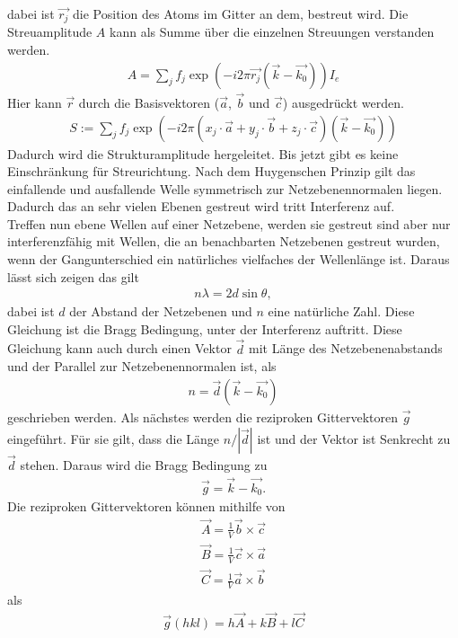 dabei ist $\vec{r_j}$ die Position des Atoms im Gitter an dem, bestreut wird. Die Streuamplitude $A$ kann als Summe über die einzelnen Streuungen verstanden werden.
\begin{align}
	A = \sum_j f_j \exp(-i2\pi\vec{r_j}\left(\vec{k}-\vec{k_0}\right))I_e
\end{align}
Hier kann $\vec{r}$ durch die Basisvektoren ($\vec{a}$, $\vec{b}$ und $\vec{c}$) ausgedrückt werden.
\begin{align}
	S:= \sum_j f_j \exp(-i2\pi\left(x_j\cdot\vec{a}+y_j\cdot\vec{b}+z_j\cdot\vec{c}\right)\left(\vec{k}-\vec{k_0}\right))
\end{align}
Dadurch wird die Strukturamplitude hergeleitet. Bis jetzt gibt es keine Einschränkung für Streurichtung. Nach dem Huygenschen Prinzip gilt das einfallende und ausfallende Welle symmetrisch zur Netzebenennormalen liegen. Dadurch das an sehr vielen Ebenen gestreut wird tritt Interferenz auf.\\
Treffen nun ebene Wellen auf einer Netzebene, werden sie gestreut sind aber nur interferenzfähig mit Wellen, die an benachbarten Netzebenen gestreut wurden, wenn der Gangunterschied ein natürliches vielfaches der Wellenlänge ist. Daraus lässt sich zeigen das gilt
\begin{align}
	n\lambda = 2d\sin\theta,\label{eq:bragg}
\end{align}
dabei ist $d$ der Abstand der Netzebenen und $n$ eine natürliche Zahl. Diese Gleichung ist die Bragg Bedingung, unter der Interferenz auftritt. Diese Gleichung kann auch durch einen Vektor $\vec{d}$ mit Länge des Netzebenenabstands und der Parallel zur Netzebenennormalen ist, als
\begin{align}
	n=\vec{d}\left(\vec{k}-\vec{k_0}\right)
\end{align}
geschrieben werden. Als nächstes werden die reziproken Gittervektoren $\vec{g}$ eingeführt.
Für sie gilt, dass die Länge $n/|\vec{d}|$ ist und der Vektor ist Senkrecht zu $\vec{d}$ stehen. Daraus wird die Bragg Bedingung zu 
\begin{align}
	\vec{g}=\vec{k}-\vec{k_0}.
\end{align}
Die reziproken Gittervektoren können mithilfe von 
\begin{align*}
	\vec{A}=\frac{1}{V}\vec{b}\times\vec{c}\\
	\vec{B}=\frac{1}{V}\vec{c}\times\vec{a}\\
	\vec{C}=\frac{1}{V}\vec{a}\times\vec{b}
\end{align*}
als
\begin{align}
	\vec{g}(hkl)=h\vec{A}+k\vec{B}+l\vec{C}
\end{align}
